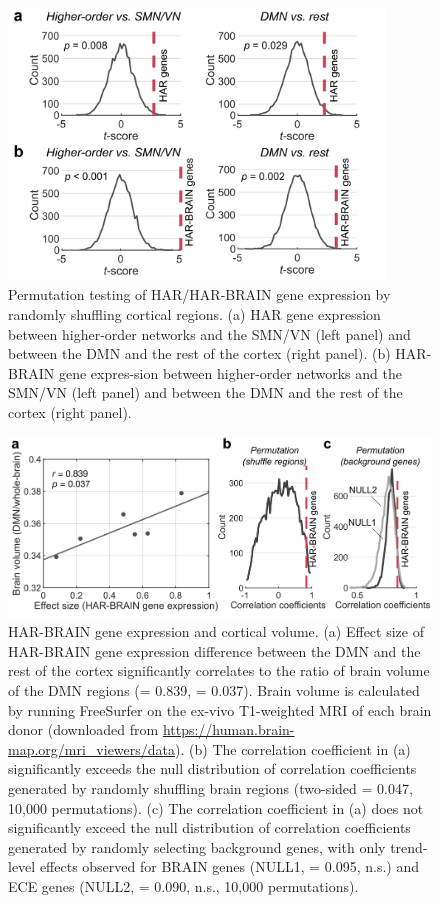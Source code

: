 \begin{refsection}
\begin{figure}[H]
    \centering
    \includegraphics[width=10cm]{images/harFigS3.png}
    \caption{Permutation testing of HAR/HAR-BRAIN gene expression by randomly shuffling cortical regions. (a) HAR gene expression between higher-order networks and the SMN/VN (left panel) and between the DMN and the rest of the cortex (right panel). (b) HAR-BRAIN gene expres-sion between higher-order networks and the SMN/VN (left panel) and between the DMN and the rest of the cortex (right panel).}
    \label{harFigs3}
\end{figure}

\begin{figure}[H]
    \centering
    \includegraphics[width=12cm]{images/harFigS4.png}
    \caption{HAR-BRAIN gene expression and cortical volume. (a) Effect size of HAR-BRAIN gene expression difference between the DMN and the rest of the cortex significantly correlates to the ratio of brain volume of the DMN regions (\rval = 0.839, \pval = 0.037). Brain volume is calculated by running FreeSurfer on the ex-vivo T1-weighted MRI of each brain donor (downloaded from \url{https://human.brain-map.org/mri\_viewers/data}). (b) The correlation coefficient in (a) significantly exceeds the null distribution of correlation coefficients generated by randomly shuffling brain regions (two-sided \pval = 0.047, 10,000 permutations). (c) The correlation coefficient in (a) does not significantly exceed the null distribution of correlation coefficients generated by randomly selecting background genes, with only trend-level effects observed for BRAIN genes (NULL1, \pval = 0.095, n.s.) and ECE genes (NULL2, \pval = 0.090, n.s., 10,000 permutations).}
    \label{harFigs4}
\end{figure}


\end{refsection}
